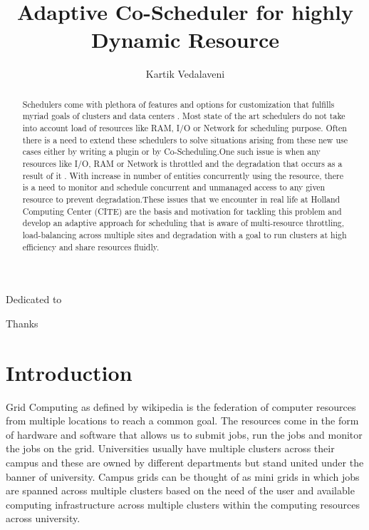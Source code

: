 \documentclass[ms,electronic,double]{nuthesis}
\begin{document}
\frontmatter
\title{Adaptive Co-Scheduler for highly Dynamic Resource}
\author{Kartik Vedalaveni}
\maketitle

\begin{abstract}
Schedulers come with plethora of features and 
options for customization that fulfills myriad goals of  
clusters and data centers . Most state of the art schedulers do not take into account load of resources 
like RAM, I/O or Network for scheduling purpose. Often there is a need to extend these schedulers to solve 
situations arising from these new use cases either by writing a plugin or by Co-Scheduling.One such 
issue is when any resources like I/O, RAM or Network is
throttled and the degradation that occurs as a result of it . With increase in number of entities concurrently 
using the resource, there is a 
need to monitor and schedule concurrent and unmanaged access to any given resource to prevent 
degradation.These issues that we encounter in real life at Holland Computing Center (CITE) are the 
basis and motivation for tackling this problem and develop an adaptive approach for scheduling 
that is aware of multi-resource throttling, load-balancing across multiple sites and degradation 
with a goal to run clusters at high efficiency and share resources fluidly. 
\end{abstract}

\begin{dedication}
Dedicated to 
\end{dedication}

\begin{acknowledgments}
Thanks
\end{acknowledgments}

\tableofcontents
\newpage
\listoffigures
\listoftables


\mainmatter

\chapter{Introduction}
Grid Computing as defined by wikipedia is the federation of computer resources from multiple locations
to reach a common goal. The resources come in the form of hardware 
and software that allows us to submit jobs, run the jobs and monitor the jobs on the grid. 
Universities usually have multiple clusters across their campus and these are 
owned by different departments but stand united under the banner of university.
Campus grids can be thought of as mini grids in which jobs are spanned across multiple clusters
 based on the need of the user and available computing infrastructure 
across multiple clusters within the computing resources across university.
\end{document}
